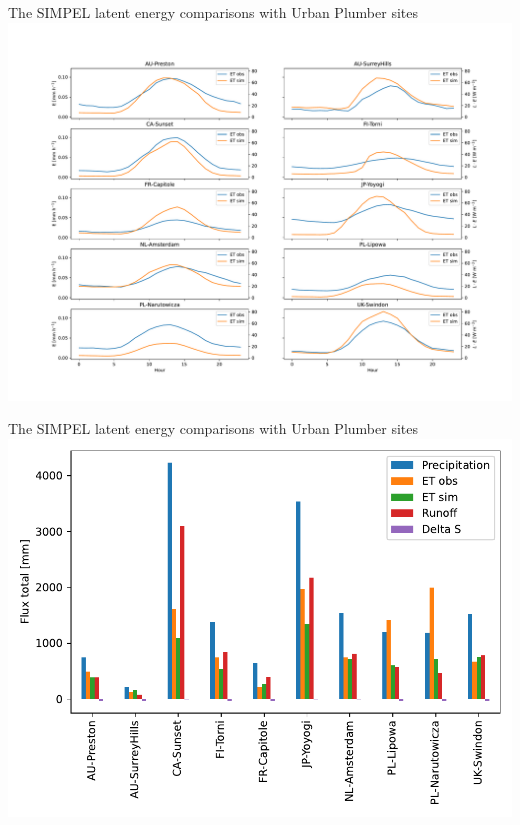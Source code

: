 \documentclass{beamer}
\begin{document}
\begin{frame}{The SIMPEL latent energy comparisons with Urban Plumber sites} 
\includegraphics[scale=0.24]{et_presunangle.pdf}
\end{frame}


\begin{frame}{The SIMPEL latent energy comparisons with Urban Plumber sites} 
\includegraphics[scale=0.50]{water_balance_presunangle.pdf}
\end{frame}
\end{document}
